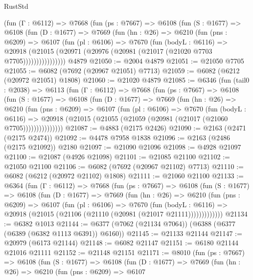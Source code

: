 \begin{lexlean}{RustStd}
\begin{coremodule}
        (fun (Γ : @6112) =>
        @7668
          (fun (ps : @7667) =>
          @6108
            (fun (S : @1677) =>
            @6108
              (fun (D : @1677) =>
              @7669
                (fun (hn : @26) =>
                @6210
                  (fun (pns : @6209) =>
                  @6107
                    (fun (pl : @6106) =>
                    @7670
                      (fun (bodyL : @6116) =>
                      @20918
                        (@21015 (@20971 (@20976 (@20981 (@21017 (@21020 @7703 @7705))))))))))))))))
    @4879
@21050 := @2004 @4879
@21051 := @21050 @7705
@21055 := @6082 (@7692 (@20967 @21051) @7713)
@21059 := @6082 (@6212 (@20972 @21051) @1808)
@21060 := @21020 @4879
@21085 := @6346
    (fun (tail0 : @2038) =>
    @6113
      (fun (Γ : @6112) =>
      @7668
        (fun (ps : @7667) =>
        @6108
          (fun (S : @1677) =>
          @6108
            (fun (D : @1677) =>
            @7669
              (fun (hn : @26) =>
              @6210
                (fun (pns : @6209) =>
                @6107
                  (fun (pl : @6106) =>
                  @7670
                    (fun (bodyL : @6116) =>
                    @20918 (@21015 (@21055 (@21059 (@20981 (@21017 (@21060 @7705)))))))))))))))
@21087 := @4883 (@2175 @2426)
@21090 := @2163 (@2471 (@2175 @2474))
@21092 := @4478 @7958 @1838
@21096 := @2163 (@2486 (@2175 @21092)) @2180
@21097 := @21090 @21096
@21098 := @4928 @21097
@21100 := @21087 (@4926 @21098)
@21101 := @21085 @21100
@21102 := @21050 @21100
@21106 := @6082 (@7692 (@20967 @21102) @7713)
@21110 := @6082 (@6212 (@20972 @21102) @1808)
@21111 := @21060 @21100
@21133 := @6364
    (fun (Γ : @6112) =>
    @7668
      (fun (ps : @7667) =>
      @6108
        (fun (S : @1677) =>
        @6108
          (fun (D : @1677) =>
          @7669
            (fun (hn : @26) =>
            @6210
              (fun (pns : @6209) =>
              @6107
                (fun (pl : @6106) =>
                @7670
                  (fun (bodyL : @6116) =>
                  @20918 (@21015 (@21106 (@21110 (@20981 (@21017 @21111)))))))))))))
@21134 := @6382 @1013
@21144 := @6377 (@7062 (@21134 @7064)) (@6388 (@6377 (@6389 (@6382 @1113 @6391)) @6160))
@21145 := @21133 @21144
@21147 := @20979 (@6173 @21144)
@21148 := @6082 @21147
@21151 := @6180 @21144 @21016 @21111
@21152 := @21148 @21151
@21171 := @8010
    (fun (ps : @7667) =>
    @6108
      (fun (S : @1677) =>
      @6108
        (fun (D : @1677) =>
        @7669
          (fun (hn : @26) =>
          @6210
            (fun (pns : @6209) =>
            @6107

\end{coremodule}
\end{lexlean}
